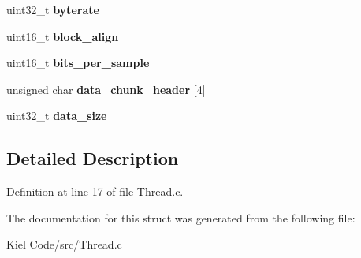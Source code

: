 \begin{DoxyCompactItemize}
uint32\+\_\+t {\bfseries byterate}
\item 
\mbox{\label{struct_w_a_v_h_e_a_d_e_r_a5cef5e91f9d1495fdf2da05b67adcb5e}} 
uint16\+\_\+t {\bfseries block\+\_\+align}
\item 
\mbox{\label{struct_w_a_v_h_e_a_d_e_r_a1eca7ea126c126e0ed765cc1b3cb477d}} 
uint16\+\_\+t {\bfseries bits\+\_\+per\+\_\+sample}
\item 
\mbox{\label{struct_w_a_v_h_e_a_d_e_r_a2c3167f6bf009f7302705afdedc68497}} 
unsigned char {\bfseries data\+\_\+chunk\+\_\+header} \mbox{[}4\mbox{]}
\item 
\mbox{\label{struct_w_a_v_h_e_a_d_e_r_ad8d1eefaf5943258b3d71a799f0ea382}} 
uint32\+\_\+t {\bfseries data\+\_\+size}
\end{DoxyCompactItemize}


\subsection{Detailed Description}


Definition at line 17 of file Thread.\+c.



The documentation for this struct was generated from the following file\+:\begin{DoxyCompactItemize}
\item 
Kiel Code/src/Thread.\+c\end{DoxyCompactItemize}
